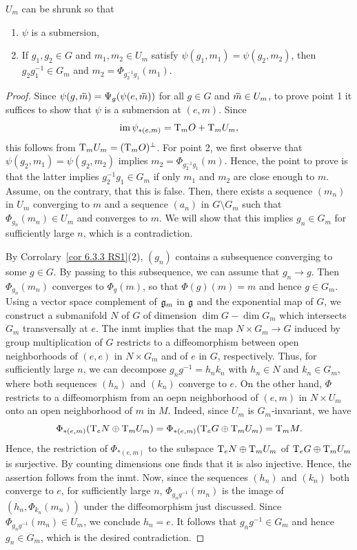 \begin{lem}[{{\cite[Lem.~6.4.5]{RS1}}}]\label{lem 6.4.5 RS1}
    $U_m$ can be shrunk so that
    \begin{enumerate}
        \item $\psi$ is a submersion,
        \item If $g_1,g_2\in G$ and $m_1,m_2\in U_m$ satisfy $\psi(g_1,m_1)=\psi(g_2,m_2)$, then $g_2g_1^{-1}\in G_m$ and $m_2=\Phi_{g_2^{-1}g_1}(m_1)$.
    \end{enumerate}
\end{lem}
\begin{proof}
    Since $\psi(g,\wt m)=\Psi_g(\psi(e,\wt m))$ for all $g\in G$ and $\wt m\in U_m$, to prove point 1 it suffices to show that $\psi$ is a submersion at $(e,m)$. Since 
    \[\operatorname{im} \psi_{\ast(e,m)}=\mathrm{T}_m O+\mathrm{T}_m U_m,\]
    this follows from $\mathrm{T}_m U_m=(\mathrm{T}_m O)^\perp$. For point 2, we first observe that $\psi(g_2,m_1)=\psi(g_2,m_2)$ implies $m_2=\Phi_{g_2^{-1}g_1}(m)$. Hence, the point to prove is that the latter implies $g_2^{-1}g_1\in G_m$ if only $m_1$ and $m_2$ are close enough to $m$. Assume, on the contrary, that this is false. Then, there exists a sequence $(m_n)$ in $U_m$ converging to $m$ and a sequence $(a_n)$ in $G\setminus G_m$ such that $\Phi_{g_n}(m_n)\in U_m$ and converges to $m$. We will show that this implies $g_n\in G_m$ for sufficiently large $n$, which is a contradiction.

    By Corrolary~\ref{cor 6.3.3 RS1}(2), $(g_n)$ contains a subsequence converging to some $g\in G$. By passing to this subsequence, we can assume that $g_n\to g$. Then $\Phi_{g_n}(m_n)$ converges to $\Phi_g(m)$, so that $\Phi(g)(m)=m$ and hence $g\in G_m$. Using a vector space complement of $\mathfrak{g}_m$ in $\mathfrak{g}$ and the exponential map of $G$, we construct a submanifold $N$ of $G$ of dimension $\dim G-\dim G_m$ which intersects $G_m$ transversally at $e$. The \gls{inmt} implies that the map $N\times G_m\to G$ induced by group multiplication of $G$ restricts to a diffeomorphism between open neighborhoods of $(e,e)$ in $N\times G_m$ and of $e$ in $G$, respectively. Thus, for sufficiently large $n$, we can decompose $g_n g^{-1}=h_nk_n$ with $h_n\in N$ and $k_n\in G_m$, where both sequences $(h_n)$ and $(k_n)$ converge to $e$. On the other hand, $\Phi$ restricts to a diffeomorphism from an oepn neighborhood of $(e,m)$ in $N\times U_m$ onto an open neighborhood of $m$ in $M$. Indeed, since $U_m$ is $G_m$-invariant, we have 
    \[\Phi_{\ast (e,m)}(\mathrm{T}_e N\oplus\mathrm{T}_m U_m)=\Phi_{\ast (e,m)}(\mathrm{T}_e G\oplus \mathrm{T}_m U_m)=\mathrm{T}_m M.\]
    Hence, the restriction of $\Phi_{\ast (e,m)}$ to the subspace $\mathrm{T}_e N\oplus \mathrm{T}_m U_m$ of $\mathrm{T}_e G\oplus \mathrm{T}_m U_m$ is surjective. By counting dimensions one finds that it is also injective. Hence, the assertion follows from the \gls{inmt}. Now, since the sequences $(h_n)$ and $(k_n)$ both converge to $e$, for sufficiently large $n$, $\Phi_{g_ng^{-1}}(m_n)$ is the image of $(h_n,\Phi_{k_n}(m_n))$ under the diffeomorphism just discussed. Since $\Phi_{g_ng^{-1}}(m_n)\in U_m$, we conclude $h_n=e$. It follows that $g_ng^{-1}\in G_m$ and hence $g_n\in G_m$, which is the desired contradiction.
\end{proof}


